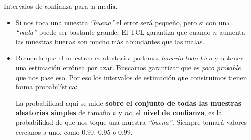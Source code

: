 \documentclass[
  9pt,
  ignorenonframetext,
]{beamer}
\begin{document}
\begin{frame}{Intervalos de confianza para la media.}
\protect\hypertarget{intervalos-de-confianza-para-la-media.-1}{}

\begin{itemize}
\item
  Si nos toca una muestra \emph{``buena''} el error será pequeño, pero
  si con una \emph{``mala''} puede ser bastante grande. El TCL garantiza
  que cuando \(n\) aumenta las muestras buenas son mucho más abundantes
  que las malas.
\item
  Recuerda que el muestreo es aleatorio: podemos \emph{hacerlo todo
  bien} y obtener una estimación errónea por azar. Buscamos garantizar
  que es \emph{poco probable} que nos pase eso. Por eso los intervalos
  de estimación que construimos tienen forma probabilística:\\

  \begin{center}
  \end{center}

  La probabilidad aquí se mide \textbf{sobre el conjunto de todas las
  muestras aleatorias simples} de tamaño \(n\) y \(nc\), el
  \textbf{nivel de confianza}, es la probabilidad de que nos toque una
  muestra \emph{``buena''}. Siempre tomará valores cercanos a uno, como
  \(0.90\), \(0.95\) o \(0.99\).
\end{itemize}

\end{frame}
\end{document}

